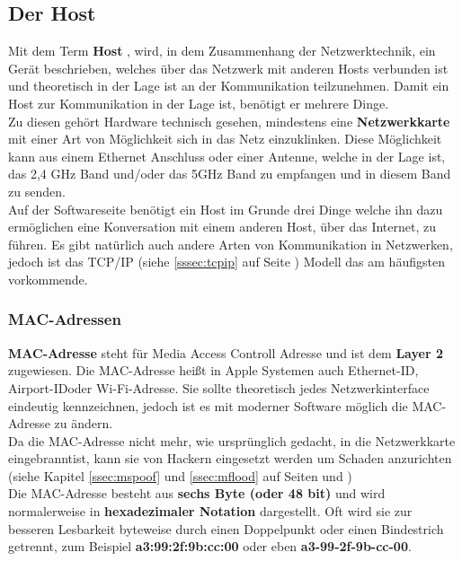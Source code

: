 \documentclass[12pt,a4paper]{report}
\begin{document}
\subsection{Der Host}
Mit dem Term \textbf{Host} , wird, in dem Zusammenhang der Netzwerktechnik, ein Gerät beschrieben, welches über das Netzwerk mit anderen Hosts verbunden ist und theoretisch in der Lage ist an der Kommunikation teilzunehmen. Damit ein Host zur Kommunikation in der Lage ist, benötigt er mehrere Dinge.\\
Zu diesen gehört Hardware technisch gesehen, mindestens eine \textbf{Netzwerkkarte} mit einer Art von Möglichkeit sich in das Netz einzuklinken. Diese Möglichkeit kann aus einem Ethernet Anschluss oder einer Antenne, welche in der Lage ist, das 2,4 GHz Band und/oder das 5GHz Band zu empfangen und in diesem Band zu senden.\\
Auf der Softwareseite benötigt ein Host im Grunde drei Dinge welche ihn dazu ermöglichen eine Konversation mit einem anderen Host, über das Internet, zu führen. Es gibt natürlich auch andere Arten von Kommunikation in Netzwerken, jedoch ist das TCP/IP (siehe \ref{sssec:tcpip} auf Seite \pageref{sssec:tcpip}) Modell das am häufigsten vorkommende. 

\subsubsection{MAC-Adressen}\label{sssec:macaddr}
\textbf{MAC-Adresse} steht für Media Access Controll Adresse und ist dem \textbf{Layer 2} zugewiesen. Die MAC-Adresse heißt in Apple Systemen auch \glqq Ethernet-ID\grqq , \glqq Airport-ID\grqq oder \glqq Wi-Fi-Adresse\grqq . Sie sollte theoretisch jedes Netzwerkinterface eindeutig kennzeichnen, jedoch ist es mit moderner Software möglich die MAC-Adresse zu ändern.\\
Da die MAC-Adresse nicht mehr, wie ursprünglich gedacht, in die Netzwerkkarte \glqq eingebrannt\grqq ist, kann sie von Hackern eingesetzt werden um Schaden anzurichten (siehe Kapitel \ref{ssec:mspoof} und \ref{ssec:mflood} auf Seiten \pageref{ssec:mspoof} und \pageref{ssec:mflood})\\

Die MAC-Adresse besteht aus \textbf{sechs Byte (oder 48 bit)} und wird normalerweise in \textbf{hexadezimaler Notation} dargestellt. Oft wird sie zur besseren Lesbarkeit byteweise durch einen Doppelpunkt oder einen Bindestrich getrennt, zum Beispiel \textbf{a3:99:2f:9b:cc:00} oder eben \textbf{a3-99-2f-9b-cc-00}.\\
\end{document}
